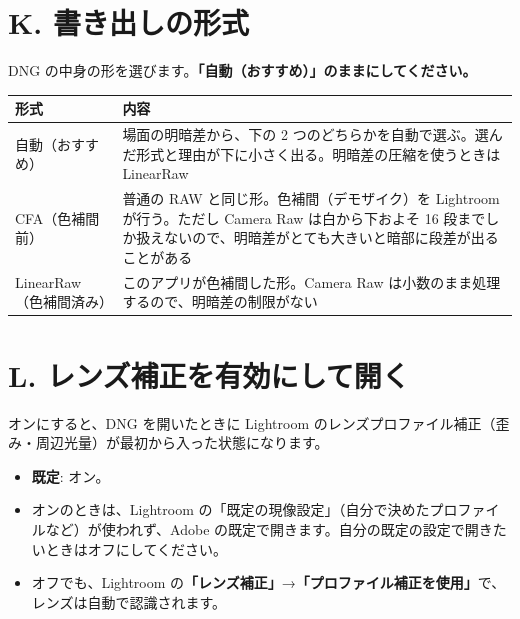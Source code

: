 \documentclass[paper=a4paper,fontsize=11pt,report,jafontsize=11pt]{jlreq}
\newcommand{\ui}[1]{\textsf{\textbf{「#1」}}}
\begin{document}
\section{K. 書き出しの形式}
DNG の中身の形を選びます。\textbf{\ui{自動（おすすめ）}のままにしてください。}

\noindent\begin{tabularx}{\linewidth}{l X}
\toprule
形式 & 内容 \\ \midrule
自動（おすすめ） & 場面の明暗差から、下の 2 つのどちらかを自動で選ぶ。選んだ形式と理由が下に小さく出る。明暗差の圧縮を使うときは LinearRaw \\
CFA（色補間前） & 普通の RAW と同じ形。色補間（デモザイク）を Lightroom が行う。ただし Camera Raw は白から下およそ 16 段までしか扱えないので、明暗差がとても大きいと暗部に段差が出ることがある \\
LinearRaw（色補間済み） & このアプリが色補間した形。Camera Raw は小数のまま処理するので、明暗差の制限がない \\
\bottomrule
\end{tabularx}

\section{L. レンズ補正を有効にして開く}
オンにすると、DNG を開いたときに Lightroom のレンズプロファイル補正（歪み・周辺光量）が最初から入った状態になります。
\begin{itemize}
  \item \textbf{既定}: オン。
  \item オンのときは、Lightroom の「既定の現像設定」（自分で決めたプロファイルなど）が使われず、Adobe の既定で開きます。自分の既定の設定で開きたいときはオフにしてください。
  \item オフでも、Lightroom の\ui{レンズ補正}→\ui{プロファイル補正を使用}で、レンズは自動で認識されます。
\end{itemize}

\end{document}
